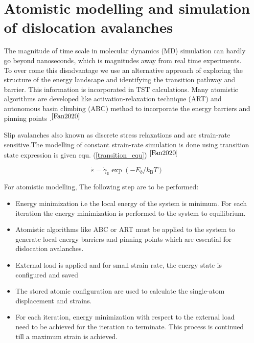 \section{Atomistic modelling and simulation of dislocation avalanches }
The magnitude of time scale in molecular dynamics (MD) simulation can hardly go beyond nanoseconds, which is magnitudes away from real time experiments. To over come this disadvantage we use an alternative approach of exploring the structure of the energy landscape and identifying the transition pathway and barrier. This information is incorporated in TST calculations. Many atomistic algorithms are developed like activation-relaxation technique (ART) and autonomous basin climbing (ABC) method to incorporate the energy barriers and pinning points .$^{\cite{Fan2020}}$

Slip avalanches also known as discrete stress relaxations and are strain-rate sensitive.The modelling of constant strain-rate simulation is done using transition state expression is given equ. (\ref{transition_equ}) $^{\cite{Fan2020}}$


\begin{equation}\label{transition_equ}
\dot{\varepsilon}=\dot{\gamma}_{0} \exp \left(-E_{b} / k_{\mathrm{B}} T\right)
\end{equation}


For atomistic modelling, The following step are to be performed:


\begin{itemize}
  \item Energy minimization i.e the local energy of the system is minimum. For each iteration the energy minimization is performed to the system to equilibrium. 
  
  \item Atomistic algorithms like ABC or ART must be applied to the system to generate local energy barriers and pinning points which are essential for dislocation avalanches.
  
  \item External load is applied and for small strain rate, the energy state is configured and saved
  
  \item The stored atomic configuration are used to calculate the single-atom displacement and strains.
  
\item For each iteration, energy minimization with respect to the external load need to be achieved for the iteration to terminate. This process is continued till a maximum  strain is achieved.
\end{itemize}

